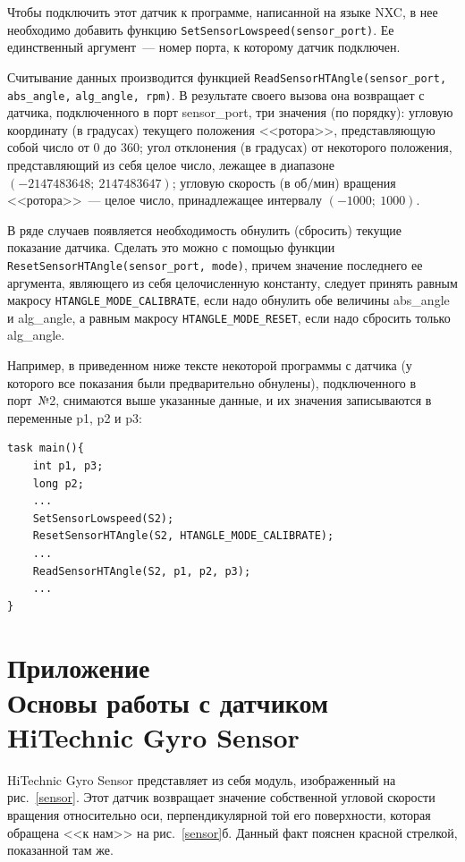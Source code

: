 \documentclass[12pt,a4paper,openany]{extarticle}
\begin{document}
Чтобы подключить этот датчик к программе, написанной на языке NXC, в нее необходимо добавить функцию \verb|SetSensorLowspeed(sensor_port)|.
Ее единственный аргумент~--- номер порта, к которому датчик подключен.

Считывание данных производится функцией \verb|ReadSensorHTAngle(sensor_port, abs_angle,| \verb|alg_angle, rpm)|.
В результате своего вызова она возвращает с датчика, подключенного в порт sensor\_port, три значения (по порядку): угловую координату (в градусах) текущего положения <<ротора>>, представляющую собой число от $0$ до $360$; угол отклонения (в градусах) от некоторого положения, представляющий из себя целое число, лежащее в диапазоне $(-2147483648;\ 2147483647)$; угловую скорость (в $\text{об}/\text{мин}$) вращения <<ротора>>~--- целое число, принадлежащее интервалу $(-1000;\ 1000)$.

В ряде случаев появляется необходимость обнулить (сбросить) текущие показание датчика.
Сделать это можно с помощью функции \verb|ResetSensorHTАngle(sensor_port, mode)|, причем значение последнего ее аргумента, являющего из себя целочисленную константу, следует принять равным макросу \verb|HTANGLE_MODE_CALIBRATE|, если надо обнулить обе величины abs\_angle и alg\_angle, а равным макросу \verb|HTANGLE_MODE_RESET|, если надо сбросить только alg\_angle.

Например, в приведенном ниже тексте некоторой программы с датчика (у которого все показания были предварительно обнулены), подключенного в порт~№2, снимаются выше указанные данные, и их значения записываются в переменные p1, p2 и p3:
\begin{verbatim}
task main(){	
    int p1, p3;
    long p2;
    ...
    SetSensorLowspeed(S2);
    ResetSensorHTАngle(S2, HTANGLE_MODE_CALIBRATE);
    ...
    ReadSensorHTAngle(S2, p1, p2, p3);
    ...
}	
\end{verbatim} 

\section*{Приложение~\myappnum\label{append:gyro_sensor}\\
Основы работы с датчиком HiTechnic Gyro Sensor}
\hspace*{\parindent}HiTechnic Gyro Sensor представляет из себя модуль, изображенный на рис.~\ref{sensor}. 
Этот датчик возвращает значение собственной угловой скорости вращения относительно оси, перпендикулярной той его поверхности, которая обращена <<к нам>> на рис.~\ref{sensor}б.
Данный факт пояснен красной стрелкой, показанной там же.
\end{document}
